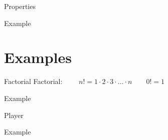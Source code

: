 \documentclass[ucs,9pt]{beamer}
\begin{document}
\begin{frame}{Properties}
	\begin{block}{Example}
		
	\end{block}
\end{frame}

\section{Examples}
\begin{frame}{Factorial}
	Factorial: $\qquad n! = 1 \cdot 2 \cdot 3 \cdot \ldots \cdot n \qquad 0! = 1$
	\begin{block}{Example}
		
	\end{block}
\end{frame}

\begin{frame}{Player}
	\begin{block}{Example}
		
	\end{block}
\end{frame}

\HNIlastframe
\end{document}
